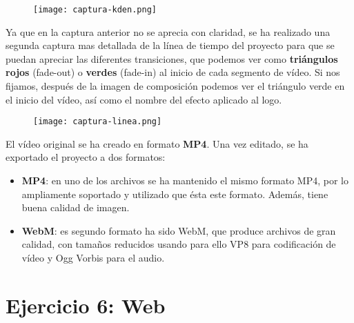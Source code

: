 \begin{figure}[H]
    \centering
    \texttt{[image: captura-kden.png]}
\end{figure}

Ya que en la captura anterior no se aprecia con claridad, se ha realizado una segunda captura mas detallada de la línea de tiempo del proyecto para que se puedan apreciar las diferentes transiciones, que podemos ver como \textbf{triángulos rojos} (fade-out) o \textbf{verdes} (fade-in) al inicio de cada segmento de vídeo. Si nos fijamos, después de la imagen de composición podemos ver el triángulo verde en el inicio del vídeo, así como el nombre del efecto aplicado al logo.

\begin{figure}[H]
    \centering
    \texttt{[image: captura-linea.png]}
\end{figure}


El vídeo original se ha creado en formato \textbf{MP4}. Una vez editado, se ha exportado el proyecto a dos formatos:

\begin{itemize}
    \item \textbf{MP4}: en uno de los archivos se ha mantenido el mismo formato MP4, por lo ampliamente soportado y utilizado que ésta este formato. Además, tiene buena calidad de imagen.

    \item \textbf{WebM}: es segundo formato ha sido WebM, que produce archivos de gran calidad, con tamaños reducidos usando para ello VP8 para codificación de vídeo y Ogg Vorbis para el audio.
\end{itemize}

\section{Ejercicio 6: Web}




%
%

